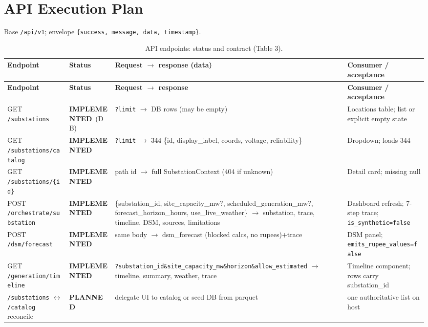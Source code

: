 \documentclass[11pt,a4paper]{article}
\newcommand{\stImpl}{\textcolor{cok}{\textbf{IMPLEMENTED}}}
\newcommand{\stPlan}{\textcolor{cplan}{\textbf{PLANNED}}}
\newcommand{\code}[1]{\texttt{\small #1}}
\begin{document}
\section{API Execution Plan}
Base \code{/api/v1}; envelope \code{\{success, message, data, timestamp\}}.

\begin{footnotesize}
\begin{longtable}{@{}p{3.5cm}p{1.6cm}p{4.0cm}p{4.4cm}@{}}
\caption{API endpoints: status and contract (Table 3).}\label{tab:api}\\
\toprule
\textbf{Endpoint} & \textbf{Status} & \textbf{Request $\rightarrow$ response (data)} & \textbf{Consumer / acceptance}\\
\midrule
\endfirsthead
\toprule
\textbf{Endpoint} & \textbf{Status} & \textbf{Request $\rightarrow$ response} & \textbf{Consumer / acceptance}\\
\midrule
\endhead
\bottomrule
\endfoot
GET \code{/substations} & \stImpl\ (DB) & \code{?limit} $\rightarrow$ DB rows (may be empty) & Locations table; list or explicit empty state\\
GET \code{/substations/catalog} & \stImpl & \code{?limit} $\rightarrow$ 344 \{id, display\_label, coords, voltage, reliability\} & Dropdown; loads 344\\
GET \code{/substations/\{id\}} & \stImpl & path id $\rightarrow$ full SubstationContext (404 if unknown) & Detail card; missing null\\
POST \code{/orchestrate/substation} & \stImpl & \{substation\_id, site\_capacity\_mw?, scheduled\_generation\_mw?, forecast\_horizon\_hours, use\_live\_weather\} $\rightarrow$ substation, trace, timeline, DSM, sources, limitations & Dashboard refresh; 7-step trace; \code{is\_synthetic=false}\\
POST \code{/dsm/forecast} & \stImpl & same body $\rightarrow$ dsm\_forecast (blocked calcs, no rupees)+trace & DSM panel; \code{emits\_rupee\_values=false}\\
GET \code{/generation/timeline} & \stImpl & \code{?substation\_id\&site\_capacity\_mw\&horizon\&allow\_estimated} $\rightarrow$ timeline, summary, weather, trace & Timeline component; rows carry substation\_id\\
\code{/substations} $\leftrightarrow$ \code{/catalog} reconcile & \stPlan & delegate UI to catalog or seed DB from parquet & one authoritative list on host\\
\end{longtable}
\end{footnotesize}
\end{document}
